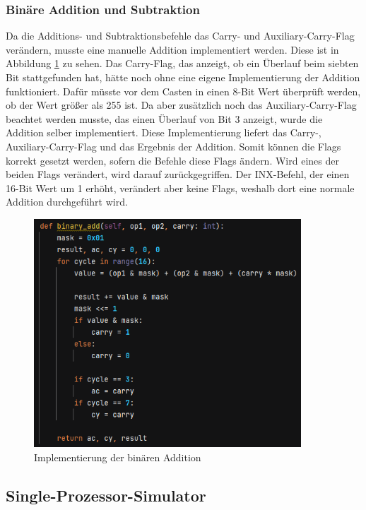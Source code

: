 \documentclass[12pt]{article}
\newcommand{\imgSpaceBefore}{\vspace{10pt}}
\begin{document}
\subsubsection{Binäre Addition und Subtraktion}
Da die Additions- und Subtraktionsbefehle das Carry- und Auxiliary-Carry-Flag verändern, musste eine manuelle Addition implementiert werden. Diese ist in Abbildung \ref{fig:binaere_addition} zu sehen. Das Carry-Flag, das anzeigt, ob ein Überlauf beim siebten Bit stattgefunden hat, hätte noch ohne eine eigene Implementierung der Addition funktioniert. Dafür müsste vor dem Casten in einen 8-Bit Wert überprüft werden, ob der Wert größer als 255 ist. Da aber zusätzlich noch das Auxiliary-Carry-Flag beachtet werden musste, das einen Überlauf von Bit 3 anzeigt, wurde die Addition selber implementiert. Diese Implementierung liefert das Carry-, Auxiliary-Carry-Flag und das Ergebnis der Addition. Somit können die Flags korrekt gesetzt werden, sofern die Befehle diese Flags ändern. Wird eines der beiden Flags verändert, wird darauf zurückgegriffen. Der INX-Befehl, der einen 16-Bit Wert um 1 erhöht, verändert aber keine Flags, weshalb dort eine normale Addition durchgeführt wird.

\imgSpaceBefore
\begin{figure}[H]
\centering
\includegraphics[width=10cm]{Bilder/binaere_addition}
\caption{Implementierung der binären Addition}
\label{fig:binaere_addition}
\end{figure}

\subsection{Single-Prozessor-Simulator}
\label{SPS_impl}
\end{document}
